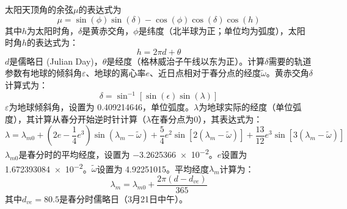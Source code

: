 太阳天顶角的余弦$\mu$的表达式为
\begin{equation}
\mu= \sin(\phi)\sin(\delta)−\cos(\phi)\cos(\delta)\cos(h)
\end{equation}
%
其中$h$为太阳时角，$\delta$是黄赤交角，$\phi$是纬度（北半球为正；单位均为弧度），太阳时角$h$的表达式为：
\begin{equation}
h=2\pi d+\theta
\end{equation}
$d$是儒略日 (Julian Day)，$\theta$是经度（格林威治子午线以东为正）。计算$\delta$需要的轨道参数有地球的倾斜角$\varepsilon$、地球的离心率$e$、近日点相对于春分点的经度$\widetilde{\omega}$。黄赤交角$\delta$计算式为：
\begin{equation}
\delta= \sin^{−1}[\sin(\epsilon) \sin(\lambda)]
\end{equation}
%
$\varepsilon$为地球倾斜角，设置为 \num{0.409214646}，单位弧度。$\lambda$为地球实际的经度（单位弧度），其计算从春分开始逆时针计算（$\lambda$在春分点为0），其表达式为：
\begin{equation}
\lambda = \lambda_{m0} + \left( 2e - \frac{1}{4}e^{3} \right)\sin\left( \lambda_{m} - \widetilde{\omega} \right) + \frac{5}{4}e^{2}\sin\left[2\left( \lambda_{m} - \widetilde{\omega} \right)\right] + \frac{13}{12}e^{3}\sin\left[3\left( \lambda_{m} - \widetilde{\omega} \right)\right]
\end{equation}
%
$\lambda_{m0}$是春分时的平均经度，设置为 \num{-3.2625366e-2}。$e$设置为 \num{1.672393084e-2}。$\widetilde{\omega}$设置为 \num{4.92251015}。平均经度$\lambda_{m}$计算为：
%
\begin{equation}
\lambda_{m} = \lambda_{m0} + \frac{2\pi\left( d - d_{ve} \right)}{365}
\end{equation}
%
其中\(d_{ve} = 80.5\)是春分时儒略日（3月21日中午）。
